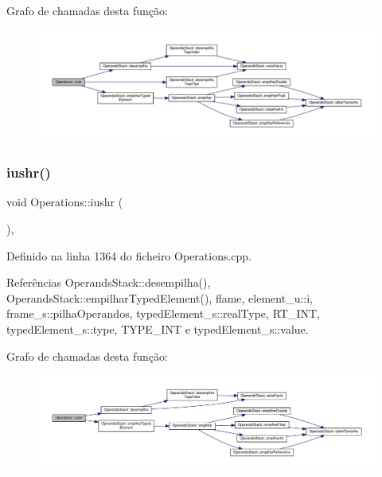 Grafo de chamadas desta função\+:
\nopagebreak
\begin{figure}[H]
\begin{center}
\leavevmode
\includegraphics[width=350pt]{classOperations_ab2808e99336de64fefb2a9073bc251de_cgraph}
\end{center}
\end{figure}
\mbox{\label{classOperations_ae3ab5ae36e587a47832886fdf4f8b2a6}} 
\subsubsection{\texorpdfstring{iushr()}{iushr()}}
{\footnotesize\ttfamily void Operations\+::iushr (\begin{DoxyParamCaption}{ }\end{DoxyParamCaption})\hspace{0.3cm}{\ttfamily [static]}, {\ttfamily [private]}}



Definido na linha 1364 do ficheiro Operations.\+cpp.



Referências Operands\+Stack\+::desempilha(), Operands\+Stack\+::empilhar\+Typed\+Element(), flame, element\+\_\+u\+::i, frame\+\_\+s\+::pilha\+Operandos, typed\+Element\+\_\+s\+::real\+Type, R\+T\+\_\+\+I\+NT, typed\+Element\+\_\+s\+::type, T\+Y\+P\+E\+\_\+\+I\+NT e typed\+Element\+\_\+s\+::value.

Grafo de chamadas desta função\+:
\nopagebreak
\begin{figure}[H]
\begin{center}
\leavevmode
\includegraphics[width=350pt]{classOperations_ae3ab5ae36e587a47832886fdf4f8b2a6_cgraph}
\end{center}
\end{figure}
\mbox{\label{classOperations_abd0ce3453623b677de3af1f05bcf4b0b}} 
